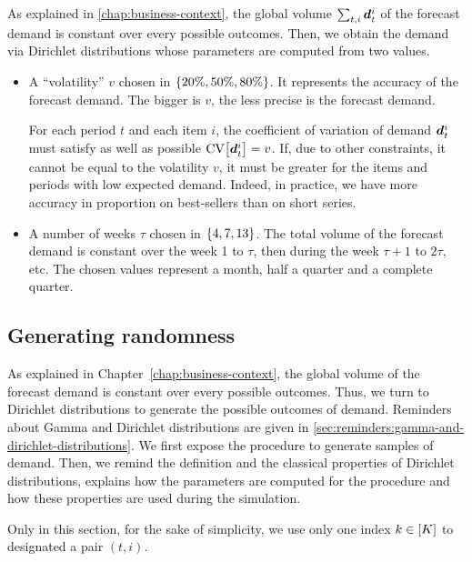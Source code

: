 As explained in \cref{chap:business-context}, the global volume $\sum_{t,i}\va\demand_t^i$ of the forecast demand is constant over every possible outcomes. Then, we obtain the demand via Dirichlet distributions whose parameters are computed from two values.
\begin{itemize}
  \item A ``volatility'' $v$ chosen in $\crbracket{20\%, 50\%, 80\%}$.
  It represents the accuracy of the forecast demand.
  The bigger is $v$, the less precise is the forecast demand.

  For each period $t$ and each item $i$, the coefficient of variation of demand $\va\demand_t^i$ must satisfy as well as possible $\CV\sqbracket{\va\demand_t^i}=v$.
  If, due to other constraints, it cannot be equal to the volatility $v$, it must be greater for the items and periods with low expected demand.
  Indeed, in practice, we have more accuracy in proportion on best-sellers than on short series.
  \item A number of weeks $\tau$ chosen in $\crbracket{4,7,13}$. The total volume of the forecast demand is constant over the week 1 to $\tau$, then during the week $\tau+1$ to $2\tau$, etc. The chosen values represent a month, half a quarter and a complete quarter.
\end{itemize}



\subsection{Generating randomness}
\label{sec:PDP:numerical-experiments:dirichlet}


As explained in Chapter~\cref{chap:business-context}, the global volume of the forecast demand is constant over every possible outcomes.
Thus, we turn to Dirichlet distributions to generate the possible outcomes of demand.
Reminders about Gamma and Dirichlet distributions are given in \cref{sec:reminders:gamma-and-dirichlet-distributions}.
We first expose the procedure to generate samples of demand.
Then, we remind the definition and the classical properties of Dirichlet distributions, explains how the parameters are computed for the procedure and how these properties are used during the simulation.

Only in this section, for the sake of simplicity, we use only one index $k\in\range{K}$ to designated a pair $(t,i)$.


